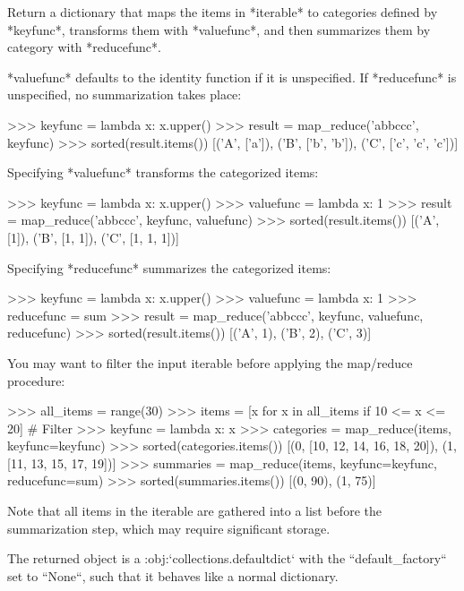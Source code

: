 \begin{DoxyVerb}Return a dictionary that maps the items in *iterable* to categories
defined by *keyfunc*, transforms them with *valuefunc*, and
then summarizes them by category with *reducefunc*.

*valuefunc* defaults to the identity function if it is unspecified.
If *reducefunc* is unspecified, no summarization takes place:

    >>> keyfunc = lambda x: x.upper()
    >>> result = map_reduce('abbccc', keyfunc)
    >>> sorted(result.items())
    [('A', ['a']), ('B', ['b', 'b']), ('C', ['c', 'c', 'c'])]

Specifying *valuefunc* transforms the categorized items:

    >>> keyfunc = lambda x: x.upper()
    >>> valuefunc = lambda x: 1
    >>> result = map_reduce('abbccc', keyfunc, valuefunc)
    >>> sorted(result.items())
    [('A', [1]), ('B', [1, 1]), ('C', [1, 1, 1])]

Specifying *reducefunc* summarizes the categorized items:

    >>> keyfunc = lambda x: x.upper()
    >>> valuefunc = lambda x: 1
    >>> reducefunc = sum
    >>> result = map_reduce('abbccc', keyfunc, valuefunc, reducefunc)
    >>> sorted(result.items())
    [('A', 1), ('B', 2), ('C', 3)]

You may want to filter the input iterable before applying the map/reduce
procedure:

    >>> all_items = range(30)
    >>> items = [x for x in all_items if 10 <= x <= 20]  # Filter
    >>> keyfunc = lambda x: x %
    >>> categories = map_reduce(items, keyfunc=keyfunc)
    >>> sorted(categories.items())
    [(0, [10, 12, 14, 16, 18, 20]), (1, [11, 13, 15, 17, 19])]
    >>> summaries = map_reduce(items, keyfunc=keyfunc, reducefunc=sum)
    >>> sorted(summaries.items())
    [(0, 90), (1, 75)]

Note that all items in the iterable are gathered into a list before the
summarization step, which may require significant storage.

The returned object is a :obj:`collections.defaultdict` with the
``default_factory`` set to ``None``, such that it behaves like a normal
dictionary.\end{DoxyVerb}
 \mbox{\label{namespacesetuptools_1_1__vendor_1_1more__itertools_1_1more_ac5acb740dfb97a2580b1c9c55d287503}} 

